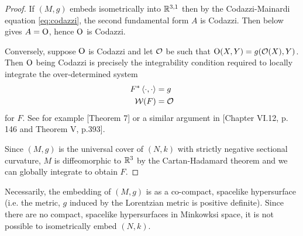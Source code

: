 \documentclass[a4paper, 12pt]{amsart}
\begin{document}
\begin{proof}
If \((M, g)\) embeds isometrically into \(\mathbb{R}^{3,1}\) then by the Codazzi-Mainardi equation \eqref{eq:codazzi}, the second fundamental form \(A\) is Codazzi. Then  below gives \(A = \operatorname{O}\), hence \(\operatorname{O}\) is Codazzi.

Conversely, suppose \(\operatorname{O}\) is Codazzi and let \(\operatorname{\mathcal{O}}\) be such that \(\operatorname{O}(X, Y) = g(\operatorname{\mathcal{O}}(X), Y)\). Then \(\operatorname{O}\) being Codazzi is precisely the integrability condition required to locally integrate the over-determined system
\begin{align*}
F^{\ast} \left\langle \cdot,\cdot \right\rangle &= g \\
\operatorname{\mathcal{W}}(F) &= \operatorname{\mathcal{O}}
\end{align*}
for \(F\). See for example \cite{MR1713298}[Theorem 7] or a similar argument in \cite{MR1013365}[Chapter VI.12, p. 146 and Theorem V, p.393].

Since \((M, g)\) is the universal cover of \((N, k)\) with strictly negative sectional curvature, \(M\) is diffeomorphic to \(\mathbb{R}^3\) by the Cartan-Hadamard theorem and we can globally integrate to obtain \(F\).
\end{proof}
\begin{rem}
Necessarily, the embedding of \((M, g)\) is as a co-compact, spacelike hypersurface (i.e. the metric, \(g\) induced by the Lorentzian metric is positive definite). Since there are no compact, spacelike hypersurfaces in Minkowksi space, it is not possible to isometrically embed \((N, k)\).
\end{rem}
\end{document}
